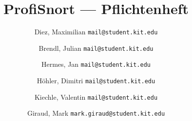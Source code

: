 \documentclass[a4paper]{scrreprt}
\begin{document}
\title{ProfiSnort --- Pflichtenheft}
\author{
    Diez, Maximilian
    \texttt{mail@student.kit.edu}
    \and
    Brendl, Julian
    \texttt{mail@student.kit.edu}
    \and
    Hermes, Jan
    \texttt{mail@student.kit.edu}
    \and
    Höhler, Dimitri
    \texttt{mail@student.kit.edu}
    \and
    Kiechle, Valentin
    \texttt{mail@student.kit.edu}
    \and
    Giraud, Mark
    \texttt{mark.giraud@student.kit.edu}
}
\maketitle



\newpage
\tableofcontents
\newpage

















\appendix

\end{document}
